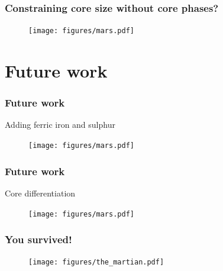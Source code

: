 \documentclass[compress,framenumber]{beamer}
\begin{document}
\begin{frame}
  \frametitle{Constraining core size without core phases?}
  \vspace{-2.0em}
  \begin{figure}
    \texttt{[image: figures/mars.pdf]}
  \end{figure}
\end{frame}

\section{Future work}
\begin{frame}
  \frametitle{Future work}
  Adding ferric iron and sulphur
  \vspace{-2.0em}
  \begin{figure}
    \texttt{[image: figures/mars.pdf]}
  \end{figure}
\end{frame}

\begin{frame}
  \frametitle{Future work}
  Core differentiation
  \vspace{-2.0em}
  \begin{figure}
    \texttt{[image: figures/mars.pdf]}
  \end{figure}
\end{frame}

\begin{frame}
  \frametitle{You survived!}
  \vspace{-2.0em}
  \begin{figure}
    \texttt{[image: figures/the\_martian.pdf]} 
  \end{figure}
\end{frame}
\end{document}
